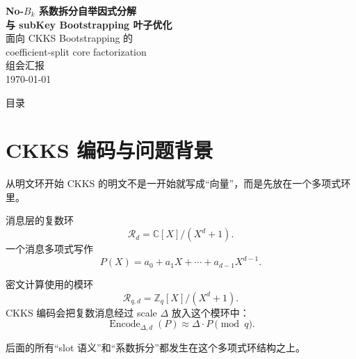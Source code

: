\documentclass[aspectratio=169, 10pt, xcolor=svgnames, table, UTF8]{ctexbeamer}
\begin{document}
\begin{frame}[plain]
  \centering
  \vspace{1cm}
  {\Large\bfseries No-\(B_k\) 系数拆分自举因式分解\\[0.3cm]
  与 subKey Bootstrapping 叶子优化}\\[0.8cm]
  
  {\large 面向 CKKS Bootstrapping 的\\[0.2cm]
  coefficient-split core factorization}\\[1.2cm]
  
  {\normalsize 组会汇报}\\[0.4cm]
  {\small \today}
  
  \vfill
\end{frame}

\begin{frame}{目录}
  \tableofcontents[hideallsubsections]
\end{frame}

\section{CKKS 编码与问题背景}

\begin{frame}{从明文环开始}
  CKKS 的明文不是一开始就写成“向量”，而是先放在一个多项式环里。
  
  \begin{block}{消息层的复数环}
    \[
    \mathcal R_d=\mathbb C[X]/(X^d+1).
    \]
    一个消息多项式写作
    \[
    P(X)=a_0+a_1X+\cdots+a_{d-1}X^{d-1}.
    \]
  \end{block}
  
  \pause
  \begin{block}{密文计算使用的模环}
    \[
    \mathcal R_{q,d}=\mathbb Z_q[X]/(X^d+1).
    \]
    CKKS 编码会把复数消息经过 scale \(\Delta\) 放入这个模环中：
    \[
    \operatorname{Encode}_{\Delta,d}(P)\approx \Delta\cdot P \pmod q.
    \]
  \end{block}
  
  后面的所有“slot 语义”和“系数拆分”都发生在这个多项式环结构之上。
\end{frame}
\end{document}
